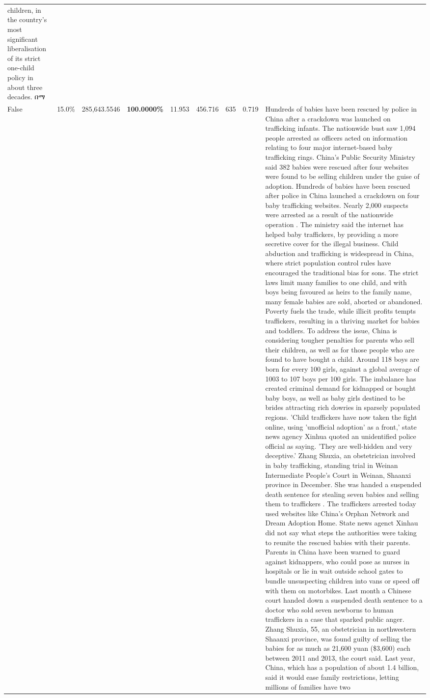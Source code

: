 \begin{table}[H]
\begin{tabular}{lllrlllll}
children, in the country's most significant liberalisation of its strict one-child policy in about three decades. በማ \\
\cline{1-9}
False & 15.0\% & \color{red} 285,643.5546 & \bfseries \color{red} 100.0000\% & 11.953 & 456.716 & 635 & 0.719 & Hundreds of babies have been rescued by police in China after a crackdown was launched on trafficking infants. The nationwide bust saw 1,094 people arrested as officers acted on information relating to four major internet-based baby trafficking rings. China's Public Security Ministry said 382 babies were rescued after four websites were found to be selling children under the guise of adoption. Hundreds of babies have been rescued after police in China launched a crackdown on four baby trafficking websites. Nearly 2,000 suspects were arrested as a result of the nationwide operation . The ministry said the internet has helped baby traffickers, by providing a more secretive cover for the illegal business. Child abduction and trafficking is widespread in China, where strict population control rules have encouraged the traditional bias for sons. The strict laws limit many families to one child, and with boys being favoured as heirs to the family name, many female babies are sold, aborted or abandoned. Poverty fuels the trade, while illicit profits tempts traffickers, resulting in a thriving market for babies and toddlers. To address the issue, China is considering tougher penalties for parents who sell their children, as well as for those people who are found to have bought a child. Around 118 boys are born for every 100 girls, against a global average of 1003 to 107 boys per 100 girls. The imbalance has created criminal demand for kidnapped or bought baby boys, as well as baby girls destined to be brides attracting rich dowries in sparsely populated regions. 'Child traffickers have now taken the fight online, using 'unofficial adoption' as a front,' state news agency Xinhua quoted an unidentified police official as saying. 'They are well-hidden and very deceptive.' Zhang Shuxia, an obstetrician involved in baby trafficking, standing trial in Weinan Intermediate People's Court in Weinan, Shaanxi province in December. She was handed a suspended death sentence for stealing seven babies and selling them to traffickers . The traffickers arrested today used websites like China's Orphan Network and Dream Adoption Home. State news agenct Xinhau did not say what steps the authorities were taking to reunite the rescued babies with their parents. Parents in China have been warned to guard against kidnappers, who could pose as nurses in hospitals or lie in wait outside school gates to bundle unsuspecting children into vans or speed off with them on motorbikes. Last month a Chinese court handed down a suspended death sentence to a doctor who sold seven newborns to human traffickers in a case that sparked public anger. Zhang Shuxia, 55, an obstetrician in northwestern Shaanxi province, was found guilty of selling the babies for as much as 21,600 yuan (\$3,600) each between 2011 and 2013, the court said. Last year, China, which has a population of about 1.4 billion, said it would ease family restrictions, letting millions of families have two 
\end{tabular}
\end{table}

